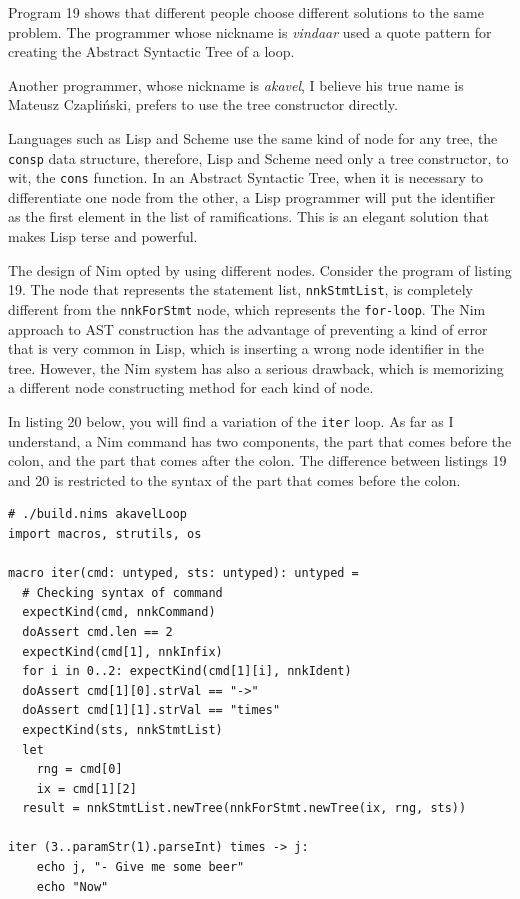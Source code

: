 \documentclass[
  12pt,
]{book}
\begin{document}
Program 19 shows that different people choose different solutions to the
same problem. The programmer whose nickname is \emph{vindaar} used a
quote pattern for creating the Abstract Syntactic Tree of a loop.

Another programmer, whose nickname is \emph{akavel}, I believe his true
name is Mateusz Czapliński, prefers to use the tree constructor
directly.

Languages such as Lisp and Scheme use the same kind of node for any
tree, the \texttt{consp} data structure, therefore, Lisp and Scheme need
only a tree constructor, to wit, the \texttt{cons} function. In an
Abstract Syntactic Tree, when it is necessary to differentiate one node
from the other, a Lisp programmer will put the identifier as the first
element in the list of ramifications. This is an elegant solution that
makes Lisp terse and powerful.

The design of Nim opted by using different nodes. Consider the program
of listing 19. The node that represents the statement list,
\texttt{nnkStmtList}, is completely different from the
\texttt{nnkForStmt} node, which represents the \texttt{for-loop}. The
Nim approach to AST construction has the advantage of preventing a kind
of error that is very common in Lisp, which is inserting a wrong node
identifier in the tree. However, the Nim system has also a serious
drawback, which is memorizing a different node constructing method for
each kind of node.

In listing 20 below, you will find a variation of the \texttt{iter}
loop. As far as I understand, a Nim command has two components, the part
that comes before the colon, and the part that comes after the colon.
The difference between listings 19 and 20 is restricted to the syntax of
the part that comes before the colon.

\begin{verbatim}
# ./build.nims akavelLoop
import macros, strutils, os

macro iter(cmd: untyped, sts: untyped): untyped =
  # Checking syntax of command
  expectKind(cmd, nnkCommand)
  doAssert cmd.len == 2
  expectKind(cmd[1], nnkInfix)
  for i in 0..2: expectKind(cmd[1][i], nnkIdent)
  doAssert cmd[1][0].strVal == "->"
  doAssert cmd[1][1].strVal == "times"
  expectKind(sts, nnkStmtList)
  let
    rng = cmd[0]
    ix = cmd[1][2]
  result = nnkStmtList.newTree(nnkForStmt.newTree(ix, rng, sts))

iter (3..paramStr(1).parseInt) times -> j:
    echo j, "- Give me some beer"
    echo "Now"
\end{verbatim}
\end{document}
